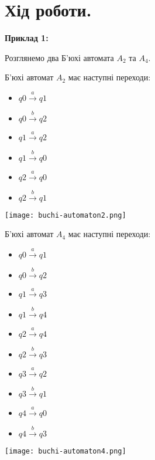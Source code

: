 \documentclass[12pt,a4paper]{article}
\begin{document}
\section*{Хід роботи.}
\label{sec:progress}

\vspace{1em}
\textbf{Приклад 1:}
\vspace{0.5em}

Розглянемо два Б'юхі автомата \(A_2\) та \(A_4\).

Б'юхі автомат \(A_2\) має наступні переходи:
\begin{itemize}
    \item \(q0 \xrightarrow{a} q1\)
    \item \(q0 \xrightarrow{b} q2\)
    \item \(q1 \xrightarrow{a} q2\)
    \item \(q1 \xrightarrow{b} q0\)
    \item \(q2 \xrightarrow{a} q0\)
    \item \(q2 \xrightarrow{b} q1\)
\end{itemize}

\texttt{[image: buchi-automaton2.png]}

Б'юхі автомат \(A_4\) має наступні переходи:
\begin{itemize}
    \item \(q0 \xrightarrow{a} q1\)
    \item \(q0 \xrightarrow{b} q2\)
    \item \(q1 \xrightarrow{a} q3\)
    \item \(q1 \xrightarrow{b} q4\)
    \item \(q2 \xrightarrow{a} q4\)
    \item \(q2 \xrightarrow{b} q3\)
    \item \(q3 \xrightarrow{a} q2\)
    \item \(q3 \xrightarrow{b} q1\)
    \item \(q4 \xrightarrow{a} q0\)
    \item \(q4 \xrightarrow{b} q3\)
\end{itemize}

\texttt{[image: buchi-automaton4.png]}
\end{document}
